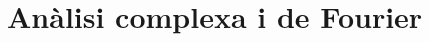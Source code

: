 \documentclass[../tercer.tex]{subfiles}
\begin{document}
\part{Anàlisi complexa i de Fourier}

\end{document}
